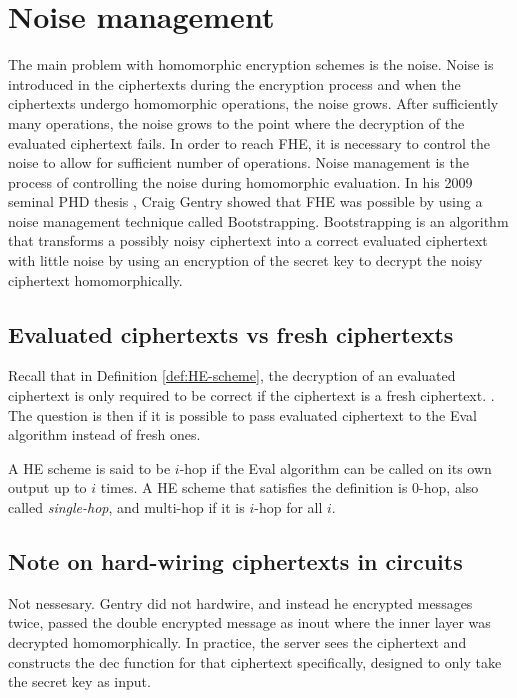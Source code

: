 \section{Noise management}

The main problem with homomorphic encryption schemes is the noise. Noise is introduced in the ciphertexts during the encryption process and when the ciphertexts undergo homomorphic operations, the noise grows. After sufficiently many operations, the noise grows to the point where the decryption of the evaluated ciphertext fails. In order to reach FHE, it is necessary to control the noise to allow for sufficient number of operations. Noise management is the process of controlling the noise during homomorphic evaluation. In his 2009 seminal PHD thesis \cite{Gentry-Thesis}, Craig Gentry showed that FHE was possible by using a noise management technique called Bootstrapping. Bootstrapping is an algorithm that transforms a possibly noisy ciphertext into a correct evaluated ciphertext with little noise by using an encryption of the secret key to decrypt the noisy ciphertext homomorphically.

\subsection*{Evaluated ciphertexts vs fresh ciphertexts}
Recall that in Definition \ref{def:HE-scheme}, the decryption of an evaluated ciphertext is only required to be correct if the ciphertext is a fresh ciphertext. . The question is then if it is possible to pass evaluated ciphertext to the Eval algorithm instead of fresh ones.

A HE scheme is said to be $i$-hop if the Eval algorithm can be called on its own output up to $i$ times. A HE scheme that satisfies the definition is $0$-hop, also called \emph{single-hop}, and multi-hop if it is $i$-hop for all $i$. 

\subsection*{Note on hard-wiring ciphertexts in circuits}
Not nessesary. Gentry did not hardwire, and instead he encrypted messages twice, passed the double encrypted message as inout where the inner layer was decrypted homomorphically.
In practice, the server sees the ciphertext and constructs the dec function for that ciphertext specifically, designed to only take the secret key as input.

